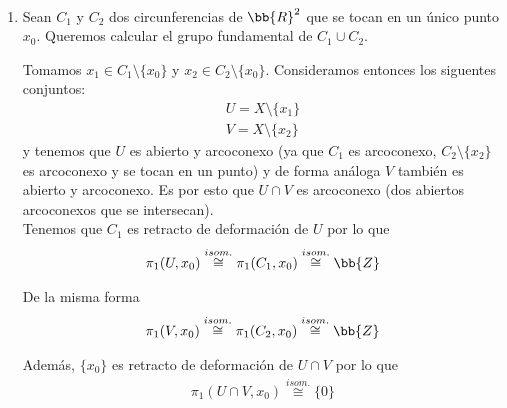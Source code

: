 \begin{ejemplo}\
    \begin{enumerate}
        \item Sean $C_1$ y $C_2$ dos circunferencias de $\bb{R}^2$ que se tocan en un único punto $x_0$. Queremos calcular el grupo fundamental de $C_1\cup C_2$.
        
        \begin{figure}[H]
            \centering
        \end{figure}

        Tomamos $x_1\in C_1\setminus\{x_0\}$ y $x_2\in C_2 \setminus \{x_0\}$. Consideramos entonces los siguentes conjuntos:
        \begin{gather*}
            U=X\setminus \{x_1\} \\
            V = X \setminus \{x_2\}
        \end{gather*}
        y tenemos que $U$ es abierto y arcoconexo (ya que $C_1$ es arcoconexo, $C_2\setminus \{x_2\}$ es arcoconexo y se tocan en un punto) y de forma análoga $V$ también es abierto y arcoconexo. Es por esto que $U\cap V$ es arcoconexo (dos abiertos arcoconexos que se intersecan).\\

        Tenemos que $C_1$ es retracto de deformación de $U$ por lo que
        \begin{gather*}
            \pi_1(U,x_0) \overset{isom.}{\cong} \pi_1(C_1,x_0) \overset{isom.}{\cong} \bb{Z}
        \end{gather*}

        De la misma forma 
        \begin{gather*}
            \pi_1(V,x_0) \overset{isom.}{\cong} \pi_1(C_2,x_0) \overset{isom.}{\cong} \bb{Z}
        \end{gather*}

        Además, $\{x_0\}$ es retracto de deformación de $U\cap V$ por lo que 
        \begin{gather*}
            \pi_1(U\cap V,x_0) \overset{isom.}{\cong} \{0\}
        \end{gather*}


\end{enumerate}
\end{ejemplo}
